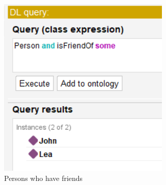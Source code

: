 \begin{figure}[H]
    \centering
    \begin{minipage}[b]{0.25\textwidth}
        \centering
        \includegraphics[width=\textwidth]{images/1.1 - tuto/DL query.png}
        \caption{Persons who have friends}
        \label{fig:image1}
    \end{minipage}
    \hfill
    \begin{minipage}[b]{0.25\textwidth}
        \centering

\end{minipage}
\end{figure}
